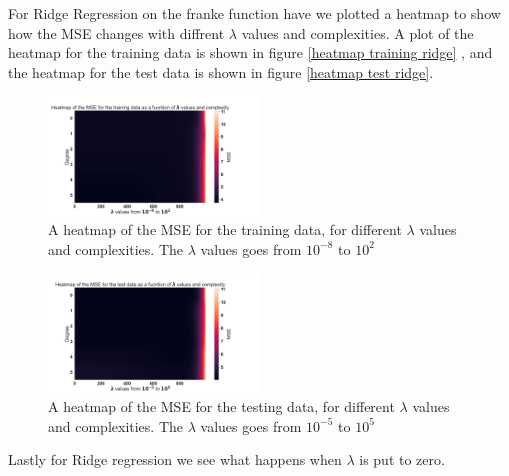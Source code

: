 \noindent For Ridge Regression on the franke function have we plotted a heatmap to show 
how the MSE changes with diffrent $\lambda$ values and complexities. A plot of
the heatmap for the training data is shown in figure \eqref{heatmap training ridge}
, and the heatmap for the test data is shown in figure \eqref{heatmap test ridge}.
\begin{figure}[H]
	\centering
	\includegraphics[width=0.5\textwidth]{Figure_8.png}
	\caption{A heatmap of the MSE for the training data, for different $\lambda$ values and complexities. The $\lambda$ values goes from $10^{-8}$ to $10^{2}$ }
	\label{heatmap training ridge}
\end{figure}
\begin{figure}[H]
	\centering
	\includegraphics[width=0.5\textwidth]{Figure_7.png}
	\caption{A heatmap of the MSE for the testing data, for different $\lambda$ values and complexities. The $\lambda$ values goes from $10^{-5}$ to $10^{5}$}
	\label{heatmap test ridge}
\end{figure}
Lastly for Ridge regression we see what happens when $\lambda$ is put to zero.




